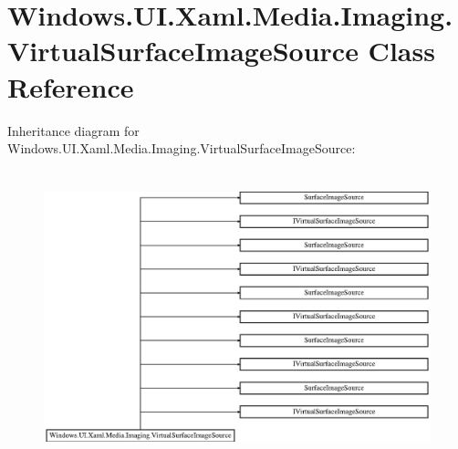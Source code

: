 \hypertarget{class_windows_1_1_u_i_1_1_xaml_1_1_media_1_1_imaging_1_1_virtual_surface_image_source}{}\section{Windows.\+U\+I.\+Xaml.\+Media.\+Imaging.\+Virtual\+Surface\+Image\+Source Class Reference}
\label{class_windows_1_1_u_i_1_1_xaml_1_1_media_1_1_imaging_1_1_virtual_surface_image_source}
Inheritance diagram for Windows.\+U\+I.\+Xaml.\+Media.\+Imaging.\+Virtual\+Surface\+Image\+Source\+:\begin{figure}[H]
\begin{center}
\leavevmode
\includegraphics[height=8.484849cm]{class_windows_1_1_u_i_1_1_xaml_1_1_media_1_1_imaging_1_1_virtual_surface_image_source}
\end{center}
\end{figure}
